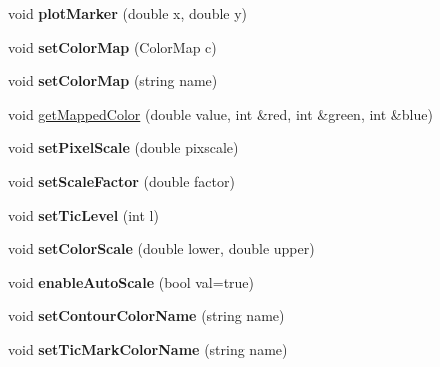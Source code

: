 \begin{DoxyCompactItemize}
\item 
\hypertarget{classPlotMaker_a66a4d4a2429a768aa46f6e764b660941}{
void {\bfseries plotMarker} (double x, double y)}
\label{classPlotMaker_a66a4d4a2429a768aa46f6e764b660941}

\item 
\hypertarget{classPlotMaker_a979ab6c35a3b71ee86f207e2b6a2e1be}{
void {\bfseries setColorMap} (ColorMap c)}
\label{classPlotMaker_a979ab6c35a3b71ee86f207e2b6a2e1be}

\item 
\hypertarget{classPlotMaker_ac20d8c88996a117e0846346d7ee9fcd3}{
void {\bfseries setColorMap} (string name)}
\label{classPlotMaker_ac20d8c88996a117e0846346d7ee9fcd3}

\item 
void \hyperlink{classPlotMaker_a26f4f8bfb6ed2483617ac8655ff0d05d}{getMappedColor} (double value, int \&red, int \&green, int \&blue)
\item 
\hypertarget{classPlotMaker_a2bd62a359a573a1104ffc8a3f6fceac0}{
void {\bfseries setPixelScale} (double pixscale)}
\label{classPlotMaker_a2bd62a359a573a1104ffc8a3f6fceac0}

\item 
\hypertarget{classPlotMaker_a841b6e3d311ad60bc355dc7802c03735}{
void {\bfseries setScaleFactor} (double factor)}
\label{classPlotMaker_a841b6e3d311ad60bc355dc7802c03735}

\item 
\hypertarget{classPlotMaker_a648464a1b252f30ea8e098bc930c2c69}{
void {\bfseries setTicLevel} (int l)}
\label{classPlotMaker_a648464a1b252f30ea8e098bc930c2c69}

\item 
\hypertarget{classPlotMaker_a6e1ab4682177f627d752c38f7fb4b4a5}{
void {\bfseries setColorScale} (double lower, double upper)}
\label{classPlotMaker_a6e1ab4682177f627d752c38f7fb4b4a5}

\item 
\hypertarget{classPlotMaker_a92d0f21f678e8d97bccf8bfbc3b545a1}{
void {\bfseries enableAutoScale} (bool val=true)}
\label{classPlotMaker_a92d0f21f678e8d97bccf8bfbc3b545a1}

\item 
\hypertarget{classPlotMaker_a94b61535c2bd1bfebabfa9c4d039c0b5}{
void {\bfseries setContourColorName} (string name)}
\label{classPlotMaker_a94b61535c2bd1bfebabfa9c4d039c0b5}

\item 
\hypertarget{classPlotMaker_abf711f48921212a7a8ef89eae1f93b9a}{
void {\bfseries setTicMarkColorName} (string name)}
\label{classPlotMaker_abf711f48921212a7a8ef89eae1f93b9a}


\end{DoxyCompactItemize}
